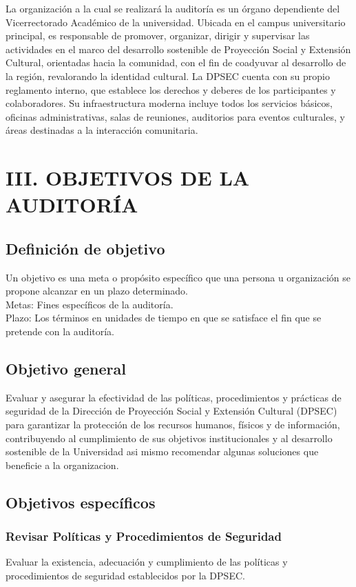 \documentclass[12pt,a4paper]{article}
\begin{document}
La organización a la cual se realizará la auditoría es un órgano dependiente del Vicerrectorado Académico de la universidad. Ubicada en el campus universitario principal, es responsable de promover, organizar, dirigir y supervisar las actividades en el marco del desarrollo sostenible de Proyección Social y Extensión Cultural, orientadas hacia la comunidad, con el fin de coadyuvar al desarrollo de la región, revalorando la identidad cultural.
\espacio
La DPSEC cuenta con su propio reglamento interno, que establece los derechos y deberes de los participantes y colaboradores. Su infraestructura moderna incluye todos los servicios básicos, oficinas administrativas, salas de reuniones, auditorios para eventos culturales, y áreas destinadas a la interacción comunitaria.

\newpage
\section{III. OBJETIVOS DE LA AUDITORÍA}
\subsection{Definición de objetivo}
Un objetivo es una meta o propósito específico que una persona u organización se propone alcanzar en un plazo determinado.
\\
Metas: Fines específicos de la auditoría.
\\
Plazo: Los términos en unidades de tiempo en que se satisface el fin que se
pretende con la auditoría.


\subsection*{Objetivo general}
Evaluar y asegurar la efectividad de las políticas, procedimientos y prácticas de seguridad de la Dirección de Proyección Social y Extensión Cultural (DPSEC) para garantizar la protección de los recursos humanos, físicos y de información, contribuyendo al cumplimiento de sus objetivos institucionales y al desarrollo sostenible de la Universidad asi mismo recomendar algunas soluciones que beneficie a la organizacion.

\subsection*{Objetivos específicos}
\subsubsection*{Revisar Políticas y Procedimientos de Seguridad} Evaluar la existencia, adecuación y cumplimiento de las políticas y procedimientos de seguridad establecidos por la DPSEC.
\end{document}

